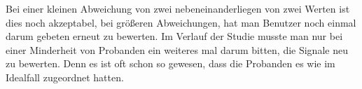 Bei einer kleinen Abweichung von zwei nebeneinanderliegen von zwei Werten ist dies noch akzeptabel, bei gr{\"o}{\ss}eren Abweichungen, hat man Benutzer noch einmal darum gebeten erneut zu bewerten. Im Verlauf der Studie musste man nur bei einer Minderheit von Probanden ein weiteres mal darum bitten, die Signale neu zu bewerten. Denn es ist oft schon so gewesen, dass die Probanden es wie im Idealfall zugeordnet hatten.







